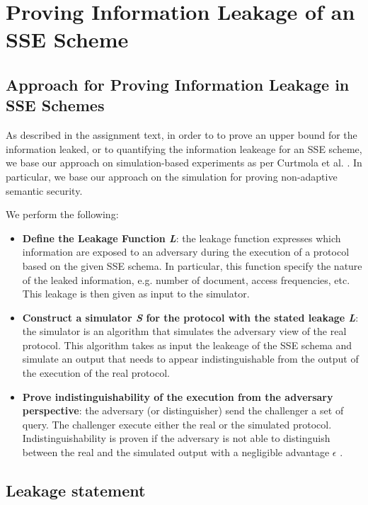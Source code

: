 \section{Proving Information Leakage of an SSE Scheme}

\subsection{Approach for Proving Information Leakage in SSE Schemes}

As described in the assignment text, in order to to prove an upper bound for the information leaked, or to quantifying the information leakeage for an SSE scheme, we base our approach on simulation-based experiments as per Curtmola et
al. \cite{article:curtmola}. In particular, we base our approach on the simulation for proving non-adaptive semantic security.

We perform the following:

\begin{itemize}
    \item \textbf{Define the Leakage Function \textit{L}}: the leakage function expresses which information are exposed to an adversary during the execution of a protocol based on the given SSE schema. In particular, this function specify the nature of the leaked information, e.g. number of document, access frequencies, etc. This leakage is then given as input to the simulator.
    \item \textbf{Construct a simulator \textit{S} for the protocol with the stated leakage \textit{L}}: the simulator is an algorithm that simulates the adversary view of the real protocol. This algorithm takes as input the leakeage of the SSE schema and simulate an output that needs to appear indistinguishable from the output of the execution of the real protocol.
    \item \textbf{Prove indistinguishability of the execution from the adversary perspective}: the adversary (or distinguisher) send the challenger a set of query. The challenger execute either the real or the simulated protocol. Indistinguishability is proven if the adversary is not able to distinguish between the real and the simulated output with a negligible advantage $\epsilon$ .
\end{itemize}

\subsection{Leakage statement}

